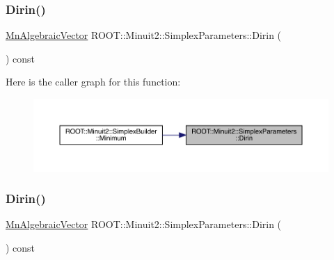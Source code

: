 \subsubsection{\texorpdfstring{Dirin()}{Dirin()}\hspace{0.1cm}{\footnotesize\ttfamily [1/3]}}
{\footnotesize\ttfamily \mbox{\hyperlink{namespaceROOT_1_1Minuit2_a62ed97730a1ca8d3fbaec64a19aa11c9}{Mn\+Algebraic\+Vector}} R\+O\+O\+T\+::\+Minuit2\+::\+Simplex\+Parameters\+::\+Dirin (\begin{DoxyParamCaption}{ }\end{DoxyParamCaption}) const}

Here is the caller graph for this function\+:
\nopagebreak
\begin{figure}[H]
\begin{center}
\leavevmode
\includegraphics[width=350pt]{d7/da2/classROOT_1_1Minuit2_1_1SimplexParameters_a40e7b3b27280a376a063a1c81904cc75_icgraph}
\end{center}
\end{figure}
\mbox{\label{classROOT_1_1Minuit2_1_1SimplexParameters_a40e7b3b27280a376a063a1c81904cc75}} 
\subsubsection{\texorpdfstring{Dirin()}{Dirin()}\hspace{0.1cm}{\footnotesize\ttfamily [2/3]}}
{\footnotesize\ttfamily \mbox{\hyperlink{namespaceROOT_1_1Minuit2_a62ed97730a1ca8d3fbaec64a19aa11c9}{Mn\+Algebraic\+Vector}} R\+O\+O\+T\+::\+Minuit2\+::\+Simplex\+Parameters\+::\+Dirin (\begin{DoxyParamCaption}{ }\end{DoxyParamCaption}) const}

\mbox{\label{classROOT_1_1Minuit2_1_1SimplexParameters_a40e7b3b27280a376a063a1c81904cc75}} 
